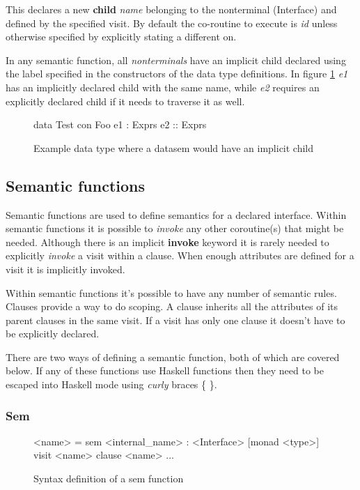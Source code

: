 This declares a new \textbf{child} \emph{name} belonging to the nonterminal (Interface) and defined by the specified visit\cite{visitag}. By default the co-routine to execute is \emph{id} unless otherwise specified by explicitly stating a different on. 

In any semantic function, all \emph{nonterminals} have an implicit child declared using the label specified in the constructors of the data type definitions. In figure \ref{child:test} \emph{e1} has an implicitly declared child with the same name, while \emph{e2} requires an explicitly declared child if it needs to traverse it as well.

\begin{figure}[!h]
\begin{code}
data Test
  con Foo
   e1 :  Exprs
   e2 :: Exprs
\end{code}
\caption{Example data type where a datasem would have an implicit child}
\label{child:test}
\end{figure}
\subsection{Semantic functions}
Semantic functions are used to define semantics for a declared interface. Within semantic functions it is possible to \emph{invoke} any other coroutine(s) that might be needed. Although there is an implicit \textbf{invoke} keyword it is rarely needed to explicitly \emph{invoke} a visit within a clause. When enough attributes are defined for a visit it is implicitly invoked.

Within semantic functions it's possible to have any number of semantic rules. Clauses provide a way to do scoping. A clause inherits all the attributes of its parent clauses in the same visit. If a visit has only one clause it doesn't have to be explicitly declared. 

There are two ways of defining a semantic function, both of which are covered below. If any of these functions use Haskell functions then they need to be escaped into Haskell mode using \emph{curly} braces \{ \}.
\subsubsection{Sem}
\begin{figure}[!h]
\begin{code}
<name> = sem <internal_name> : <Interface> [monad <type>]
          {visit <name>
             {clause <name>
                ...
             }
          }
\end{code}
\caption{Syntax definition of a sem function}
\label{sem:syntax}
\end{figure}

